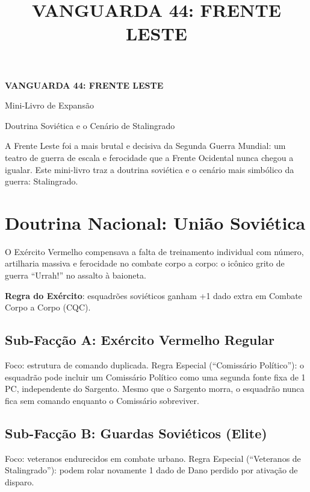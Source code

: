 \documentclass[11pt]{article}
\title{\bfseries\color{vinho}\Huge VANGUARDA 44: FRENTE LESTE}
\author{}
\date{}
\begin{document}
\begin{titlepage}
\centering
\vspace*{3cm}
{\Huge\bfseries\color{vinho} VANGUARDA 44: FRENTE LESTE \par}
\vspace{0.5cm}
{\Large\color{mostarda} Mini-Livro de Expansão \par}
\vspace{2cm}
{\large Doutrina Soviética e o Cenário de Stalingrado \par}
\vfill
\end{titlepage}

\tableofcontents

\bigskip

A Frente Leste foi a mais brutal e decisiva da Segunda Guerra Mundial: um teatro de guerra de escala e ferocidade que a Frente Ocidental nunca chegou a igualar. Este mini-livro traz a doutrina soviética e o cenário mais simbólico da guerra: Stalingrado.

\section{Doutrina Nacional: União Soviética}

O Exército Vermelho compensava a falta de treinamento individual com número, artilharia massiva e ferocidade no combate corpo a corpo: o icônico grito de guerra ``Urrah!'' no assalto à baioneta.

\textbf{Regra do Exército}: esquadrões soviéticos ganham +1 dado extra em Combate Corpo a Corpo (CQC).

\subsection{Sub-Facção A: Exército Vermelho Regular}

Foco: estrutura de comando duplicada. Regra Especial (``Comissário Político''): o esquadrão pode incluir um Comissário Político como uma segunda fonte fixa de 1 PC, independente do Sargento. Mesmo que o Sargento morra, o esquadrão nunca fica sem comando enquanto o Comissário sobreviver.

\subsection{Sub-Facção B: Guardas Soviéticos (Elite)}

Foco: veteranos endurecidos em combate urbano. Regra Especial (``Veteranos de Stalingrado''): podem rolar novamente 1 dado de Dano perdido por ativação de disparo.
\end{document}

